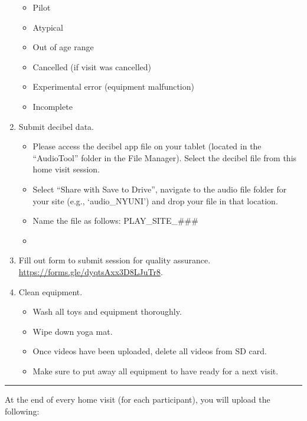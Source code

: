 \documentclass[
]{book}
\providecommand{\tightlist}{%
  \setlength{\itemsep}{0pt}\setlength{\parskip}{0pt}}
\begin{document}
\begin{enumerate}
  \begin{itemize}
  \tightlist
  \item
    Pilot
  \item
    Atypical
  \item
    Out of age range
  \item
    Cancelled (if visit was cancelled)
  \item
    Experimental error (equipment malfunction)
  \item
    Incomplete
  \end{itemize}
\item
  Submit decibel data.

  \begin{itemize}
  \tightlist
  \item
    Please access the decibel app file on your tablet (located in the ``AudioTool'' folder in the File Manager). Select the decibel file from this home visit session.
  \item
    Select ``Share with Save to Drive'', navigate to the audio file folder for your site (e.g., `audio\_NYUNI') and drop your file in that location.
  \item
    Name the file as follows: PLAY\_SITE\_\#\#\#
  \item
  \end{itemize}
\item
  Fill out form to submit session for quality assurance. \url{https://forms.gle/dyqtsAxx3D8LJuTr8}.
\item
  Clean equipment.

  \begin{itemize}
  \tightlist
  \item
    Wash all toys and equipment thoroughly.
  \item
    Wipe down yoga mat.
  \item
    Once videos have been uploaded, delete all videos from SD card.
  \item
    Make sure to put away all equipment to have ready for a next visit.
  \end{itemize}
\end{enumerate}

\begin{center}\rule{0.5\linewidth}{0.5pt}\end{center}

At the end of every home visit (for each participant), you will upload the following:
\end{document}
